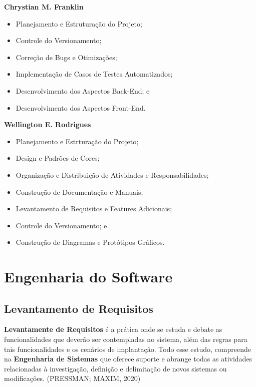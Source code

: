 \documentclass[a4paper,12pt]{article}
\begin{document}
\vspace{2em}
\textbf{Chrystian M. Franklin}
\begin{itemize}
    	\item Planejamento e Estruturação do Projeto;
    	\item Controle do Versionamento;
    	\item Correção de Bugs e Otimizações;
    	\item Implementação de Casos de Testes Automatizados;
    	\item Desenvolvimento dos Aspectos Back-End; e
    	\item Desenvolvimento dos Aspectos Front-End.
\end{itemize}

\vspace{2em}
\textbf{Wellington E. Rodrigues}
\begin{itemize}
	\item Planejamento e Estrturação do Projeto;
    	\item Design e Padrões de Cores;
    	\item Organização e Distribuição de Atividades e Responsabilidades;
    	\item Construção de Documentação e Manuais;
   	\item Levantamento de Requisitos e Features Adicionais;
    	\item Controle do Versionamento; e
    	\item Construção de Diagramas e Protótipos Gráficos.

\end{itemize}

\pagebreak
\section{Engenharia do Software}
\subsection{Levantamento de Requisitos}
\textbf{Levantamente de Requisitos} é a prática onde se estuda e debate as funcionalidades que deverão ser contempladas no sistema, 
além das regras para tais funcionalidades e os cenários de implantação. Todo esse estudo, compreende na \textbf{Engenharia de Sistemas} 
que oferece suporte e abrange todas as atividades relacionadas à investigação, definição e delimitação de novos sistemas ou modificações.
(PRESSMAN; MAXIM, 2020)
\end{document}
